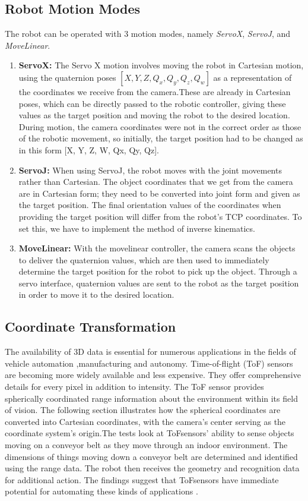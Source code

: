 \documentclass[12pt]{article}
\begin{document}
\subsection{Robot Motion Modes}
The robot can be operated with 3 motion modes, namely \textit{ServoX}, \textit{ServoJ}, and \textit{MoveLinear}.\

\begin{enumerate}
    \item \textbf{ServoX:} The Servo X motion involves moving the robot in Cartesian motion, using the quaternion poses $[X, Y, Z, Q_x, Q_y, Q_z, Q_w]$ as a representation of the coordinates we receive from the camera.These are already in Cartesian poses, which can be directly passed to the robotic controller, giving these values as the target position and moving the robot to the desired location. During motion, the camera coordinates were not in the correct order as those of the robotic movement, so initially, the target position had to be changed as in this form [X, Y, Z, W, Qx, Qy, Qz].
    \item \textbf{ServoJ:} When using ServoJ, the robot moves with the joint movements rather than Cartesian. The object coordinates that we get from the camera are in Cartesian form; they need to be converted into joint form and given as the target position. The final orientation values of the coordinates when providing the target position will differ from the robot's TCP coordinates. To set this, we have to implement the method of inverse kinematics.
    \item \textbf{MoveLinear:} With the movelinear controller, the camera scans the objects to deliver the quaternion values, which are then used to immediately determine the target position for the robot to pick up the object. Through a servo interface, quaternion values are sent to the robot as the target position in order to move it to the desired location.
\end{enumerate}

\newpage
\subsection{Coordinate Transformation}
The availability of 3D data is essential for numerous applications in the fields of vehicle automation ,manufacturing and autonomy.  Time-of-flight (ToF) sensors are becoming more widely available and less expensive.  They offer comprehensive details for every pixel in addition to intensity.  The ToF sensor provides spherically coordinated range information about the environment within its field of vision.  The following section illustrates how the spherical coordinates are converted into Cartesian coordinates, with the camera's center serving as the coordinate system's origin.The tests look at ToFsensors' ability to sense objects moving on a conveyor belt as they move through an indoor environment.  The dimensions of things moving down a conveyor belt are determined and identified using the range data.  The robot then receives the geometry and recognition data for additional action.  The findings suggest that ToFsensors have immediate potential for automating these kinds of applications \cite{ref5}.\\
\end{document}
